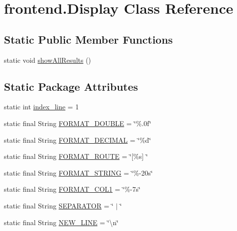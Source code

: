 \hypertarget{classfrontend_1_1_display}{}\section{frontend.\+Display Class Reference}
\label{classfrontend_1_1_display}
\subsection*{Static Public Member Functions}
\begin{DoxyCompactItemize}
\item 
static void \hyperlink{classfrontend_1_1_display_a80dcb9108b718e006f2f97f287619236}{show\+All\+Results} ()
\end{DoxyCompactItemize}
\subsection*{Static Package Attributes}
\begin{DoxyCompactItemize}
\item 
static int \hyperlink{classfrontend_1_1_display_a797d702fc749e192653dc7ff22f2b7d3}{index\+\_\+line} = 1
\item 
static final String \hyperlink{classfrontend_1_1_display_a3202ef0fbf05daddfc35487906120bf4}{F\+O\+R\+M\+A\+T\+\_\+\+D\+O\+U\+B\+LE} = \char`\"{}\%.\+0f\char`\"{}
\item 
static final String \hyperlink{classfrontend_1_1_display_a1db97f649b144d230b033c755d295919}{F\+O\+R\+M\+A\+T\+\_\+\+D\+E\+C\+I\+M\+AL} = \char`\"{}\%d\char`\"{}
\item 
static final String \hyperlink{classfrontend_1_1_display_ab921c44addef8a93aa1315d71a7cdeec}{F\+O\+R\+M\+A\+T\+\_\+\+R\+O\+U\+TE} = \char`\"{}\mbox{[}\%s\mbox{]} \char`\"{}
\item 
static final String \hyperlink{classfrontend_1_1_display_a9a97059c1e7fc38f14b04f12caf7cca7}{F\+O\+R\+M\+A\+T\+\_\+\+S\+T\+R\+I\+NG} = \char`\"{}\%-\/20s\char`\"{}
\item 
static final String \hyperlink{classfrontend_1_1_display_a3a734a034b56b660fdba49e5c5283978}{F\+O\+R\+M\+A\+T\+\_\+\+C\+O\+L1} = \char`\"{}\%-\/7s\char`\"{}
\item 
static final String \hyperlink{classfrontend_1_1_display_a28290e54b617dbdaf5bfdb6c17a78e23}{S\+E\+P\+A\+R\+A\+T\+OR} = \char`\"{} $\vert$ \char`\"{}
\item 
static final String \hyperlink{classfrontend_1_1_display_a7724180a6e1ef99585bcb779b8800480}{N\+E\+W\+\_\+\+L\+I\+NE} = \char`\"{}\textbackslash{}n\char`\"{}
\end{DoxyCompactItemize}
